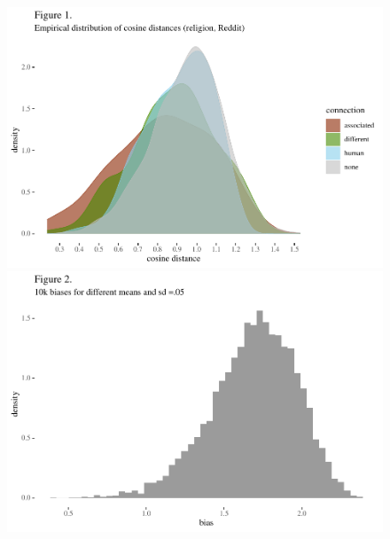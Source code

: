\documentclass[
  12pt,
  dvipsnames,enabledeprecatedfontcommands]{scrartcl}
\begin{document}
\begin{center}
\begin{figure}[!htb]\centering
   \begin{minipage}{0.48\textwidth}

\begin{center}\includegraphics[width=1\linewidth]{abstractESSLLI1_files/figure-latex/unnamed-chunk-1-1} \end{center}
   \end{minipage}
   \begin {minipage}{0.48\textwidth}

\begin{center}\includegraphics[width=1\linewidth]{abstractESSLLI1_files/figure-latex/unnamed-chunk-2-1} \end{center}
   \end{minipage}
   

\end{figure}
\end{center}
\end{document}
